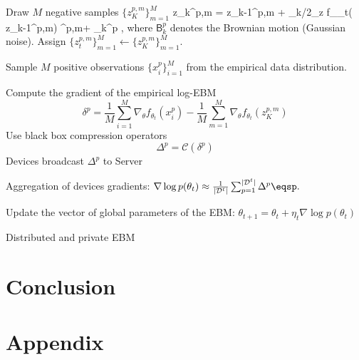 \documentclass[11pt]{article}
\begin{document}
\begin{algorithm}[H]
\DontPrintSemicolon
  
\hrulefill

{	
	
	{
		{Draw $M$ negative samples $\{ z_{K}^{p,m} \}_{m=1}^M$} 
			{
			\beq\notag
			z_{k}^{p,m} = z_{k-1}^{p,m} + \gamma_k/2\nabla_z f_{\theta_t}( z_{k-1}^{p,m})  ^{p,m}+  _k^p \eqsp,
			\eeq
			where $\mathsf{B}_k^p$ denotes the Brownian motion (Gaussian noise).
			}
		{Assign $\{ z_{t}^{p,m} \}_{m=1}^M \leftarrow \{ z_{K}^{p,m} \}_{m=1}^M$.}
		
		{Sample $M$ positive observations $\{ x^p_{i} \}_{i=1}^M$ from the empirical data distribution.}
		
		{Compute the gradient of the empirical log-EBM} 
		{
		$$\delta^p = \frac{1}{M} \sum_{i=1}^{M} \nabla_{\theta} f_{\theta_t}\left(x^p_{i}\right)- \frac{1}{M} 	\sum_{m=1}^{M} \nabla_{\theta} f_{\theta_t}\left(z_K^{p,m}\right)$$
		}
		{Use black box compression operators}
		{
		$$\Delta^p = \mathcal{C}(\delta^p )$$
		}
		{Devices broadcast $\Delta^p$ to Server} 
	}
	
	  
	{Aggregation of devices gradients: $\nabla \log p(\theta_t) \approx  \frac{1}{|\mathcal{D}^t|} \sum_{p=1}^{|\mathcal{D}^t|} \Delta^p\eqsp.$}

	{Update the vector of global parameters of the EBM: $\theta_{t+1} = \theta_{t} + \eta_t \nabla \log p(\theta_t)$}
}
\caption{Distributed and private EBM}
\end{algorithm}

\section{Conclusion}\label{sec:conclusion}



\newpage



\newpage
\appendix 

\section{Appendix}\label{sec:appendix}


\end{document}
